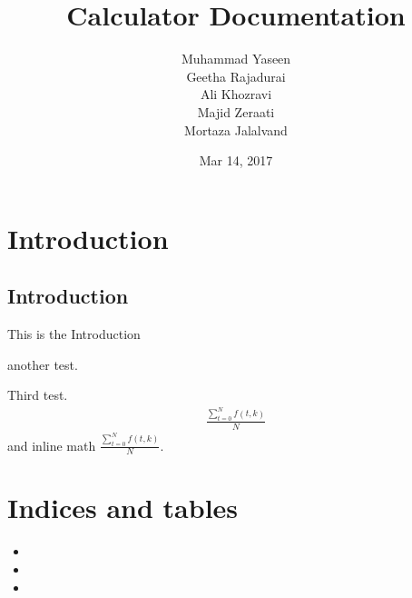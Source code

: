 \documentclass[letterpaper,10pt,english]{sphinxmanual}
\title{Calculator Documentation}
\date{Mar 14, 2017}
\author{Muhammad Yaseen\\Geetha Rajadurai\\Ali Khozravi\\Majid Zeraati\\Mortaza Jalalvand}
\begin{document}
\maketitle
\sphinxtableofcontents
{}\label{\detokenize{index::doc}}



\chapter{Introduction}
\label{\detokenize{index:welcome-to-calculator-s-documentation}}\label{\detokenize{index:introduction}}

\section{Introduction}
\label{\detokenize{index:id1}}
This is the Introduction

\begin{sphinxVerbatim}[commandchars=\\\{\}]
  \PYG{p}{[}      \PYG{p}{]}
\PYG{p}{[}\PYG{p}{]}
\PYG{p}{[}\PYG{p}{]}
\PYG{p}{[}\PYG{p}{]}

\end{sphinxVerbatim}

another test.

\begin{sphinxVerbatim}[commandchars=\\\{\}]

  

   
      
   
\end{sphinxVerbatim}

Third test.
\begin{equation*}
\begin{split}\frac{ \sum_{t=0}^{N}f(t,k) }{N}\end{split}
\end{equation*}
and inline math \(\frac{ \sum_{t=0}^{N}f(t,k) }{N}\).


\chapter{Indices and tables}
\label{\detokenize{index:indices-and-tables}}\begin{itemize}
\item {} 

\item {} 

\item {} 

\end{itemize}



\renewcommand{\indexname}{Index}
\printindex
\end{document}
